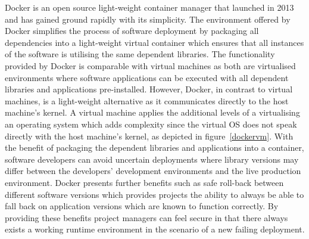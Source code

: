 Docker is an open source light-weight container manager that launched in 2013 and has gained ground rapidly with its simplicity. The environment offered by Docker simplifies the process of software deployment by packaging all dependencies into a light-weight virtual container which ensures that all instances of the software is utilising the same dependent libraries. The functionality provided by Docker is comparable with virtual machines as both are virtualised environments where software applications can be executed with all dependent libraries and applications pre-installed. However, Docker, in contrast to virtual machines, is a light-weight alternative as it communicates directly to the host machine's kernel. A virtual machine applies the additional levels of a virtualising an operating system which adds complexity since the virtual OS does not speak directly with the host machine's kernel, as depicted in figure~\ref{dockervm}. With the benefit of packaging the dependent libraries and applications into a container, software developers can avoid uncertain deployments where library versions may differ between the developers' development environments and the live production environment. Docker presents further benefits such as safe roll-back between different software versions which provides projects the ability to always be able to fall back on application versions which are known to function correctly. By providing these benefits project managers can feel secure in that there always exists a working runtime environment in the scenario of a new failing deployment.\\


